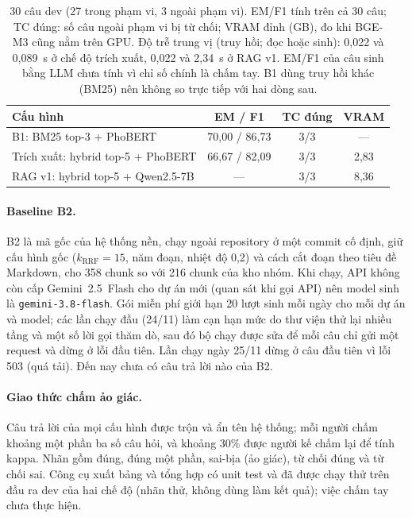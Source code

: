 \begin{table}[h]
\centering\small
\begin{tabular}{@{}>{\raggedright\arraybackslash}p{}ccc@{}}
\toprule
\textbf{Cấu hình} & \textbf{EM / F1} & \textbf{TC đúng} & \textbf{VRAM} \\
\midrule
B1: BM25 top-3 + PhoBERT & 70,00 / 86,73 & 3/3 & --- \\
Trích xuất: hybrid top-5 + PhoBERT & 66,67 / 82,09 & 3/3 & 2,83 \\
RAG v1: hybrid top-5 + Qwen2.5-7B & --- & 3/3 & 8,36 \\
\bottomrule
\end{tabular}
\caption{30 câu dev (27 trong phạm vi, 3 ngoài phạm vi). EM/F1 tính trên cả 30 câu; TC đúng: số câu ngoài phạm vi bị từ chối; VRAM đỉnh (GB), đo khi BGE-M3 cũng nằm trên GPU. Độ trễ trung vị (truy hồi; đọc hoặc sinh): 0,022 và 0,089~s ở chế độ trích xuất, 0,022 và 2,34~s ở RAG v1. EM/F1 của câu sinh bằng LLM chưa tính vì chỉ số chính là chấm tay. B1 dùng truy hồi khác (BM25) nên không so trực tiếp với hai dòng sau.}
\label{tab:rag}
\end{table}

\paragraph{Baseline B2.} B2 là mã gốc của hệ thống nền, chạy ngoài repository ở một commit cố định, giữ cấu hình gốc ($k_{\mathrm{RRF}}=15$, năm đoạn, nhiệt độ 0,2) và cách cắt đoạn theo tiêu đề Markdown, cho 358 chunk so với 216 chunk của kho nhóm. Khi chạy, API không còn cấp Gemini~2.5~Flash cho dự án mới (quan sát khi gọi API) nên model sinh là \texttt{gemini-3.8-flash}. Gói miễn phí giới hạn 20 lượt sinh mỗi ngày cho mỗi dự án và model; các lần chạy đầu (24/11) làm cạn hạn mức do thư viện thử lại nhiều tầng và một số lời gọi thăm dò, sau đó bộ chạy được sửa để mỗi câu chỉ gửi một request và dừng ở lỗi đầu tiên. Lần chạy ngày 25/11 dừng ở câu đầu tiên vì lỗi 503 (quá tải). Đến nay chưa có câu trả lời nào của B2.

\paragraph{Giao thức chấm ảo giác.} Câu trả lời của mọi cấu hình được trộn và ẩn tên hệ thống; mỗi người chấm khoảng một phần ba số câu hỏi, và khoảng 30\% được người kế chấm lại để tính kappa. Nhãn gồm đúng, đúng một phần, sai-bịa (ảo giác), từ chối đúng và từ chối sai. Công cụ xuất bảng và tổng hợp có unit test và đã được chạy thử trên đầu ra dev của hai chế độ (nhãn thử, không dùng làm kết quả); việc chấm tay chưa thực hiện.
